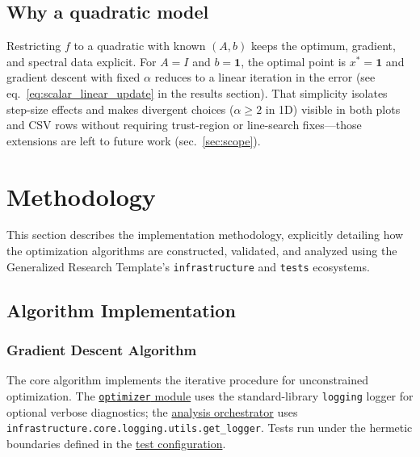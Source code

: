 \documentclass[
]{article}
\begin{document}
\subsection{Why a quadratic model}\label{why-a-quadratic-model}

Restricting \(f\) to a quadratic with known \((A,b)\) keeps the optimum,
gradient, and spectral data explicit. For \(A = I\) and
\(b = \mathbf{1}\), the optimal point is \(x^\ast = \mathbf{1}\) and
gradient descent with fixed \(\alpha\) reduces to a linear iteration in
the error (see eq.~\ref{eq:scalar_linear_update} in the results
section). That simplicity isolates step-size effects and makes divergent
choices (\(\alpha \geq 2\) in 1D) visible in both plots and CSV rows
without requiring trust-region or line-search fixes---those extensions
are left to future work (sec.~\ref{sec:scope}).

\newpage

\section{Methodology}\label{sec:methodology}

This section describes the implementation methodology, explicitly
detailing how the optimization algorithms are constructed, validated,
and analyzed using the Generalized Research Template's
\texttt{infrastructure} and \texttt{tests} ecosystems.

\subsection{Algorithm Implementation}\label{algorithm-implementation}

\subsubsection{Gradient Descent
Algorithm}\label{gradient-descent-algorithm}

The core algorithm implements the iterative procedure for unconstrained
optimization. The
\href{https://github.com/docxology/template/blob/main/projects/template_code_project/src/optimizer.py}{\texttt{optimizer}
module} uses the standard-library \texttt{logging} logger for optional
verbose diagnostics; the
\href{https://github.com/docxology/template/blob/main/projects/template_code_project/scripts/optimization_analysis.py}{analysis
orchestrator} uses
\texttt{infrastructure.core.logging.utils.get\_logger}. Tests run under
the hermetic boundaries defined in the
\href{https://github.com/docxology/template/blob/main/projects/template_code_project/tests/conftest.py}{test
configuration}.
\end{document}
